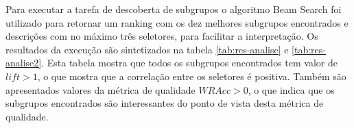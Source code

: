 \documentclass[12pt]{article}
\begin{document}
Para executar a tarefa de descoberta de subgrupos o algoritmo Beam Search foi utilizado para retornar um ranking com os dez melhores subgrupos encontrados e descrições com no máximo três seletores, para facilitar a interpretação. Os resultados da execução são sintetizados na tabela \ref{tab:res-analise} e \ref{tab:res-analise2}. Esta tabela mostra que todos os subgrupos encontrados tem valor de $lift > 1$, o que mostra que a correlação entre os seletores é positiva. Também são apresentados valores da métrica de qualidade $WRAcc > 0$, o que indica que os subgrupos encontrados são interessantes do ponto de vista desta métrica de qualidade.

\end{document}
